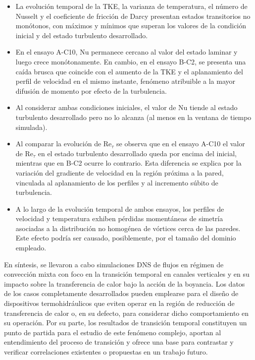 \begin{itemize}

\item La evolución temporal de la TKE, la varianza de temperatura, el número de Nusselt y el coeficiente de fricción de Darcy presentan estados transitorios no monótonos, con \linebreak máximos y mínimos que superan los valores de la condición inicial y del estado turbulento desarrollado.

\item En el ensayo A-C10, Nu permanece cercano al valor del estado laminar y luego crece monótonamente. En cambio, en el ensayo B-C2, se presenta una caída brusca que \linebreak coincide con el aumento de la TKE y el aplanamiento del perfil de velocidad en el mismo instante, fenómeno atribuible a la mayor difusión de momento por efecto de la \linebreak turbulencia. 

\item Al considerar ambas condiciones iniciales, el valor de Nu tiende al estado turbulento desarrollado pero no lo alcanza (al menos en la ventana de tiempo simulada). 

\item Al comparar la evolución de $\text{Re}_{\tau}$ se observa que en el ensayo A-C10 el valor de $\text{Re}_{\tau}$  en el estado turbulento desarrollado queda por encima del inicial, mientras que en B-C2 ocurre lo contrario. Esta diferencia se explica por la variación del gradiente de velocidad en la región próxima a la pared, vinculada al aplanamiento de los perfiles y al incremento súbito de turbulencia.

\item A lo largo de la evolución temporal de ambos ensayos, los perfiles de velocidad y temperatura exhiben pérdidas momentáneas de simetría asociadas a la distribución no homogénea de vórtices cerca de las paredes. Este efecto podría ser causado, posiblemente, por el tamaño del dominio empleado.

\end{itemize}

En síntesis, se llevaron a cabo simulaciones DNS de flujos en régimen de convección mixta con foco en la transición temporal en canales verticales y en su impacto sobre la \linebreak transferencia de calor bajo la acción de la boyancia. Los datos de los casos completamente \linebreak desarrollados pueden emplearse para el diseño de dispositivos termohidráulicos que eviten \linebreak operar en la región de reducción de transferencia de calor o, en su defecto, para considerar \linebreak dicho  comportamiento en su operación. Por su parte, los resultados de transición temporal constituyen un punto de partida para el estudio de este fenómeno complejo, aportan al entendimiento del proceso de transición y ofrece una base para contrastar y verificar correlaciones existentes o propuestas en un trabajo futuro.
